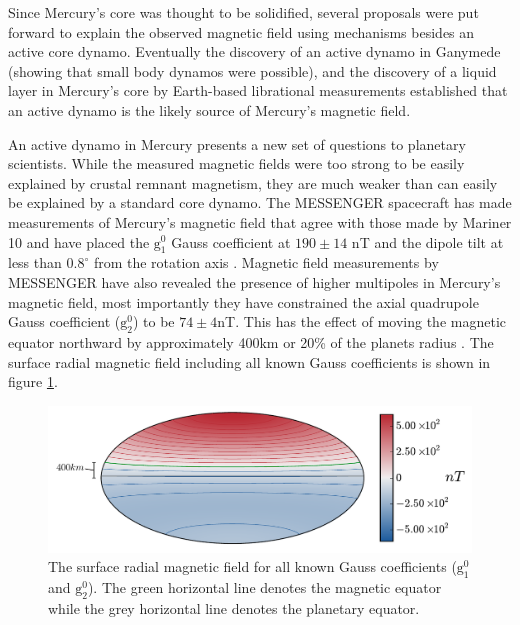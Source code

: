 Since Mercury's core was thought to be solidified, several proposals were put forward to explain the observed magnetic field using mechanisms besides an active core dynamo. Eventually the discovery of an active dynamo in Ganymede \citep{kivelson1996} (showing that small body dynamos were possible), and the discovery of a liquid layer in Mercury's core by Earth-based librational measurements \citep{margot2007,margot2012} established that an active dynamo is the likely source of Mercury's magnetic field.

An active dynamo in Mercury presents a new set of questions to planetary scientists. While the measured magnetic fields were too strong to be easily explained by crustal remnant magnetism, they are much weaker than can easily be explained by a standard core dynamo. The MESSENGER spacecraft has made measurements of Mercury's magnetic field that agree with those made by Mariner 10 and have placed the $\mathrm{g}_1^0$ Gauss coefficient at $190\pm 14$ nT and the dipole tilt at less than $0.8^{\circ}$ from the rotation axis \citep{anderson2012}. Magnetic field measurements by MESSENGER have also revealed the presence of higher multipoles in Mercury's magnetic field, most importantly they have constrained the axial quadrupole Gauss coefficient ($\mathrm{g}_{2}^0$) to be $74\pm4$nT. This has the effect of moving the magnetic equator northward by approximately 400km or 20\% of the planets radius \citep{anderson2012}. The surface radial magnetic field including all known Gauss coefficients is shown in figure \ref{fig:Mercurybr}.
\begin{figure}
	\centering
	\noindent\includegraphics[width=\linewidth]{Chapter4/figures/Mercury_br.pdf}
	\caption{The surface radial magnetic field for all known Gauss coefficients ($\mathrm{g}_1^0$ and $\mathrm{g}_2^0$). The green horizontal line denotes the magnetic equator while the grey horizontal line denotes the planetary equator.}
	\label{fig:Mercurybr}
\end{figure}

